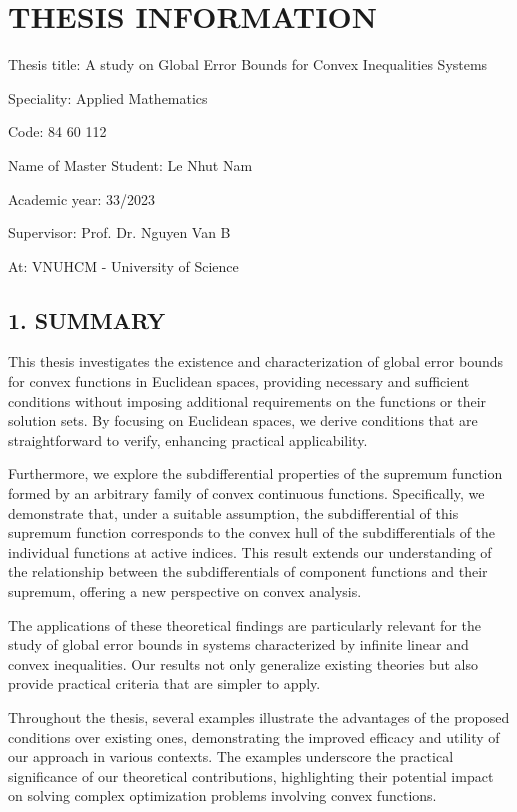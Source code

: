 \chapter*{THESIS INFORMATION}

\begin{flushleft}
Thesis title: A study on Global Error Bounds for Convex Inequalities Systems

Speciality: Applied Mathematics

Code: 84 60 112

Name of Master Student: Le Nhut Nam

Academic year: 33/2023

Supervisor: Prof. Dr. Nguyen Van B

At: VNUHCM - University of Science
\end{flushleft}

\section*{1. SUMMARY}

This thesis investigates the existence and characterization of global error bounds for convex functions in Euclidean spaces, providing necessary and sufficient conditions without imposing additional requirements on the functions or their solution sets. By focusing on Euclidean spaces, we derive conditions that are straightforward to verify, enhancing practical applicability.

Furthermore, we explore the subdifferential properties of the supremum function formed by an arbitrary family of convex continuous functions. Specifically, we demonstrate that, under a suitable assumption, the subdifferential of this supremum function corresponds to the convex hull of the subdifferentials of the individual functions at active indices. This result extends our understanding of the relationship between the subdifferentials of component functions and their supremum, offering a new perspective on convex analysis.

The applications of these theoretical findings are particularly relevant for the study of global error bounds in systems characterized by infinite linear and convex inequalities. Our results not only generalize existing theories but also provide practical criteria that are simpler to apply.

Throughout the thesis, several examples illustrate the advantages of the proposed conditions over existing ones, demonstrating the improved efficacy and utility of our approach in various contexts. The examples underscore the practical significance of our theoretical contributions, highlighting their potential impact on solving complex optimization problems involving convex functions.


